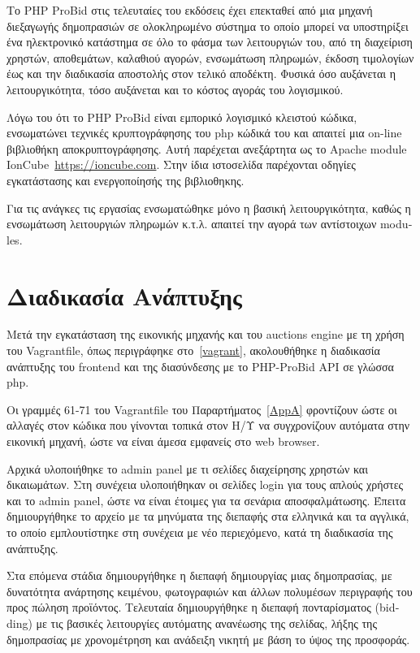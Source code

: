 \documentclass[12pt]{report}
\begin{document}
Το \textlatin{PHP ProBid} στις τελευταίες του εκδόσεις έχει επεκταθεί από μια μηχανή διεξαγωγής δημοπρασιών σε ολοκληρωμένο σύστημα το οποίο μπορεί να υποστηρίξει ένα ηλεκτρονικό κατάστημα σε όλο το φάσμα των λειτουργιών του, από τη διαχείριση χρηστών, αποθεμάτων, καλαθιού αγορών, ενσωμάτωση πληρωμών, έκδοση τιμολογίων έως και την διαδικασία αποστολής στον τελικό αποδέκτη. Φυσικά όσο αυξάνεται η λειτουργικότητα, τόσο αυξάνεται και το κόστος αγοράς του λογισμικού.

Λόγω του ότι το \textlatin{PHP ProBid} είναι εμπορικό λογισμικό κλειστού κώδικα, ενσωματώνει τεχνικές κρυπτογράφησης του \textlatin{php} κώδικά του και απαιτεί μια \textlatin{on-line} βιβλιοθήκη αποκρυπτογράφησης. Αυτή παρέχεται ανεξάρτητα ως το \textlatin{Apache module IonCube~\url{https://ioncube.com}}. Στην ίδια ιστοσελίδα παρέχονται οδηγίες εγκατάστασης και ενεργοποίησής της βιβλιοθηκης.

Για τις ανάγκες τις εργασίας ενσωματώθηκε μόνο η βασική λειτουργικότητα, καθώς η ενσωμάτωση λειτουργιών πληρωμών κ.τ.λ. απαιτεί την αγορά των αντίστοιχων \textlatin{modules}.

\section{Διαδικασία Ανάπτυξης}
Μετά την εγκατάσταση της εικονικής μηχανής και του \textlatin{auctions engine} με τη χρήση του \textlatin{Vagrantfile}, όπως περιγράφηκε στο~\ref{vagrant}, ακολουθήθηκε η διαδικασία ανάπτυξης του \textlatin{frontend} και της διασύνδεσης με το \textlatin{PHP-ProBid API} σε γλώσσα \textlatin{php}.

Οι γραμμές 61-71 του \textlatin{Vagrantfile} του Παραρτήματος~\ref{AppA} φροντίζουν ώστε οι αλλαγές στον κώδικα που γίνονται τοπικά στον Η/Υ να συγχρονίζουν αυτόματα στην εικονική μηχανή, ώστε να είναι άμεσα εμφανείς στο \textlatin{web browser}.

Αρχικά υλοποιήθηκε το \textlatin{admin panel} με τι σελίδες διαχείρησης χρηστών και δικαιωμάτων. Στη συνέχεια υλοποιήθηκαν οι σελίδες \textlatin{login} για τους απλούς χρήστες και το \textlatin{admin panel}, ώστε να είναι έτοιμες για τα σενάρια αποσφαλμάτωσης. Έπειτα δημιουργήθηκε το αρχείο με τα μηνύματα της διεπαφής στα ελληνικά και τα αγγλικά, το οποίο εμπλουτίστηκε στη συνέχεια με νέο περιεχόμενο, κατά τη διαδικασία της ανάπτυξης.

Στα επόμενα στάδια δημιουργήθηκε η διεπαφή δημιουργίας μιας δημοπρασίας, με δυνατότητα ανάρτησης κειμένου, φωτογραφιών και άλλων πολυμέσων περιγραφής του προς πώληση προϊόντος. Τελευταία δημιουργήθηκε η διεπαφή πονταρίσματος (\textlatin{bidding}) με τις βασικές λειτουργίες αυτόματης ανανέωσης της σελίδας, λήξης της δημοπρασίας με χρονομέτρηση και ανάδειξη νικητή με βάση το ύψος της προσφοράς.
\end{document}
